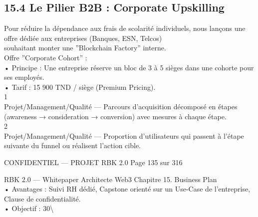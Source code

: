 \subsection{15.4 Le Pilier B2B : Corporate Upskilling}
Pour réduire la dépendance aux frais de scolarité individuels, nous lançons une offre dédiée aux entreprises (Banques, ESN, Telcos)\\
souhaitant monter une ”Blockchain Factory” interne.\\
Offre ”Corporate Cohort” :\\
\vspace{0.5em}
• Principe : Une entreprise réserve un bloc de 3 à 5 sièges dans une cohorte pour ses employés.\\
\vspace{0.5em}
• Tarif : 15 900 TND / siège (Premium Pricing).\\
1\\
Projet/Management/Qualité — Parcours d’acquisition décomposé en étapes (awareness → consideration → conversion) avec mesures à chaque étape.\\
2\\
Projet/Management/Qualité — Proportion d’utilisateurs qui passent à l’étape suivante du funnel ou réalisent l’action cible.\\
\vspace{0.5em}
\vspace{0.5em}
\begin{confidential}CONFIDENTIEL — PROJET RBK 2.0                                        Page 135 sur 316\end{confidential}
RBK 2.0 — Whitepaper Architecte Web3                                                                            Chapitre 15. Business Plan\\
\vspace{0.5em}
\vspace{0.5em}
• Avantages : Suivi RH dédié, Capstone orienté sur un Use-Case de l’entreprise, Clause de confidentialité.\\
\vspace{0.5em}
• Objectif : 30\textbackslash{}%
\vspace{0.5em}
\vspace{0.5em}
